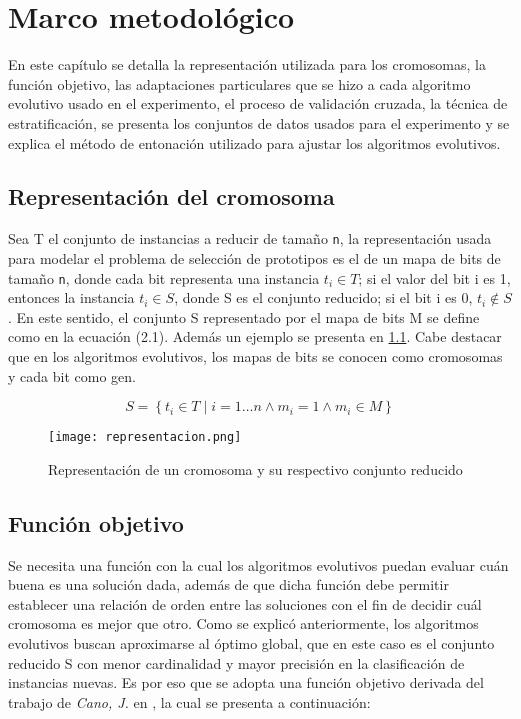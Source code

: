 \chapter{Marco metodológico}
\label{capitulo2}

En este capítulo se detalla la representación utilizada para los cromosomas, la función objetivo, las adaptaciones particulares que se hizo a cada algoritmo evolutivo usado en el experimento, el proceso de validación cruzada, la técnica de estratificación, se presenta los conjuntos de datos usados para el experimento y se explica el método de entonación utilizado para ajustar los algoritmos evolutivos.

\section{Representación del cromosoma}

Sea T el conjunto de instancias a reducir de tamaño \texttt{n}, la representación usada para modelar el problema de selección de prototipos es el de un mapa de bits de tamaño \texttt{n}, donde cada bit representa una instancia $t_i \in T$; si el valor del bit i es 1, entonces la instancia $t_i \in S$, donde S es el conjunto reducido; si el bit i es 0, $t_i \notin S$. En este sentido, el conjunto S representado por el mapa de bits M se define como en la ecuación (2.1). Además un ejemplo se presenta en \ref{representacion}. Cabe destacar que en los algoritmos evolutivos, los mapas de bits se conocen como cromosomas y cada bit como gen.

\begin{equation}
S = \left\{ t_i \in T \mid i = 1 \dots n \land m_i = 1 \land m_i \in M \right\}
\end{equation} 

\begin{figure}[]
\centering
\texttt{[image: representacion.png]}
\caption[Representación de un cromosoma y su respectivo conjunto reducido]{Representación de un cromosoma y su respectivo conjunto reducido}
\label{representacion}
\end{figure}

\section{Función objetivo}

Se necesita una función con la cual los algoritmos evolutivos puedan evaluar cuán buena es una solución dada, además de que dicha función debe permitir establecer una relación de orden entre las soluciones con el fin de decidir cuál cromosoma es mejor que otro. Como se explicó anteriormente, los algoritmos evolutivos buscan aproximarse al óptimo global, que en este caso es el conjunto reducido S con menor cardinalidad y mayor precisión en la clasificación de instancias nuevas. Es por eso que se adopta una función objetivo derivada del trabajo de \emph{Cano, J.} en \cite{de2004reduccion}, la cual se presenta a continuación:


